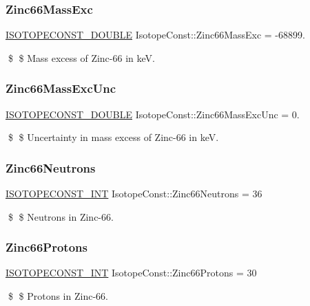 \subsubsection{\texorpdfstring{Zinc66\+Mass\+Exc}{Zinc66MassExc}}
{\footnotesize\ttfamily \mbox{\hyperlink{group___isotope_const-_macros_ga8f45a7272ce02c0b4c65c44636ed719a}{I\+S\+O\+T\+O\+P\+E\+C\+O\+N\+S\+T\+\_\+\+D\+O\+U\+B\+LE}} Isotope\+Const\+::\+Zinc66\+Mass\+Exc = -\/68899.}

\$ \$ Mass excess of Zinc-\/66 in keV. \mbox{\label{group___isotope_const-_zinc-_zn66_ga65e3a874cd96d3bf93f252a71b66216a}} 
\subsubsection{\texorpdfstring{Zinc66\+Mass\+Exc\+Unc}{Zinc66MassExcUnc}}
{\footnotesize\ttfamily \mbox{\hyperlink{group___isotope_const-_macros_ga8f45a7272ce02c0b4c65c44636ed719a}{I\+S\+O\+T\+O\+P\+E\+C\+O\+N\+S\+T\+\_\+\+D\+O\+U\+B\+LE}} Isotope\+Const\+::\+Zinc66\+Mass\+Exc\+Unc = 0.}

\$ \$ Uncertainty in mass excess of Zinc-\/66 in keV. \mbox{\label{group___isotope_const-_zinc-_zn66_gaa6aefe62d2d0c8e071a55b1f5e1b4e5c}} 
\subsubsection{\texorpdfstring{Zinc66\+Neutrons}{Zinc66Neutrons}}
{\footnotesize\ttfamily \mbox{\hyperlink{group___isotope_const-_macros_ga5f18360b3e99483a35c32d789e62621c}{I\+S\+O\+T\+O\+P\+E\+C\+O\+N\+S\+T\+\_\+\+I\+NT}} Isotope\+Const\+::\+Zinc66\+Neutrons = 36}

\$ \$ Neutrons in Zinc-\/66. \mbox{\label{group___isotope_const-_zinc-_zn66_ga73051c31bbea4615c2c33702f622131c}} 
\subsubsection{\texorpdfstring{Zinc66\+Protons}{Zinc66Protons}}
{\footnotesize\ttfamily \mbox{\hyperlink{group___isotope_const-_macros_ga5f18360b3e99483a35c32d789e62621c}{I\+S\+O\+T\+O\+P\+E\+C\+O\+N\+S\+T\+\_\+\+I\+NT}} Isotope\+Const\+::\+Zinc66\+Protons = 30}

\$ \$ Protons in Zinc-\/66. 